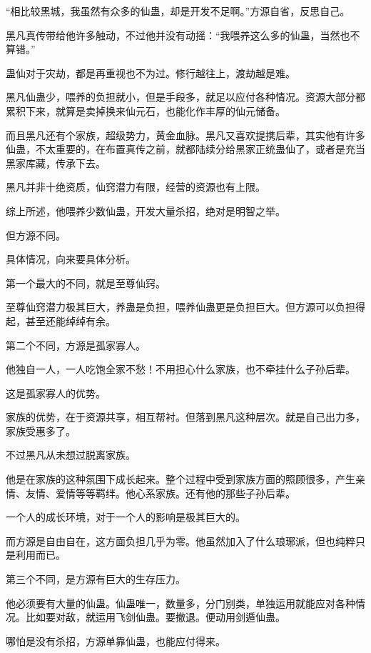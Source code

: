 
\begin{this_body}

“相比较黑城，我虽然有众多的仙蛊，却是开发不足啊。”方源自省，反思自己。

黑凡真传带给他许多触动，不过他并没有动摇：“我喂养这么多的仙蛊，当然也不算错。”

蛊仙对于灾劫，都是再重视也不为过。修行越往上，渡劫越是难。

黑凡仙蛊少，喂养的负担就小，但是手段多，就足以应付各种情况。资源大部分都累积下来，就算是卖掉换来仙元石，也能化作丰厚的仙元储备。

而且黑凡还有个家族，超级势力，黄金血脉。黑凡又喜欢提携后辈，其实他有许多仙蛊，不太重要的，在布置真传之前，就都陆续分给黑家正统蛊仙了，或者是充当黑家库藏，传承下去。

黑凡并非十绝资质，仙窍潜力有限，经营的资源也有上限。

综上所述，他喂养少数仙蛊，开发大量杀招，绝对是明智之举。

但方源不同。

具体情况，向来要具体分析。

第一个最大的不同，就是至尊仙窍。

至尊仙窍潜力极其巨大，养蛊是负担，喂养仙蛊更是负担巨大。但方源可以负担得起，甚至还能绰绰有余。

第二个不同，方源是孤家寡人。

他独自一人，一人吃饱全家不愁！不用担心什么家族，也不牵挂什么子孙后辈。

这是孤家寡人的优势。

家族的优势，在于资源共享，相互帮衬。但落到黑凡这种层次。就是自己出力多，家族受惠多了。

不过黑凡从未想过脱离家族。

他是在家族的这种氛围下成长起来。整个过程中受到家族方面的照顾很多，产生亲情、友情、爱情等等羁绊。他心系家族。还有他的那些子孙后辈。

一个人的成长环境，对于一个人的影响是极其巨大的。

而方源是自由自在，这方面负担几乎为零。他虽然加入了什么琅琊派，但也纯粹只是利用而已。

第三个不同，是方源有巨大的生存压力。

他必须要有大量的仙蛊。仙蛊唯一，数量多，分门别类，单独运用就能应对各种情况。比如要对敌，就运用飞剑仙蛊。要撤退。便动用剑遁仙蛊。

哪怕是没有杀招，方源单靠仙蛊，也能应付得来。


\end{this_body}

